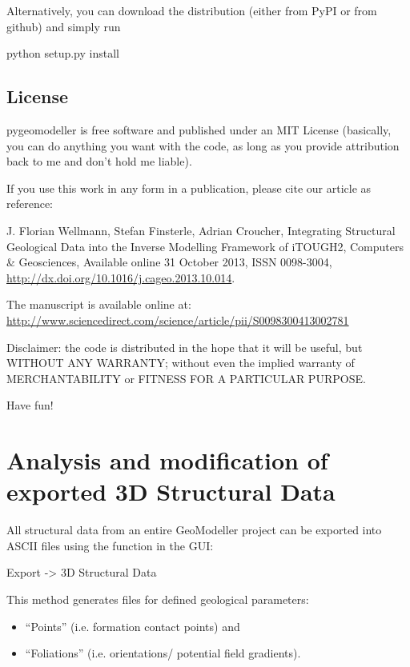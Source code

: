 \documentclass[letterpaper,10pt,english]{sphinxmanual}
\begin{document}
Alternatively, you can download the distribution (either from PyPI or
from github) and simply run

python setup.py install


\section{License}
\label{readme:license}
pygeomodeller is free software and published under an MIT License
(basically, you can do anything you want with the code, as long as you
provide attribution back to me and don't hold me liable).

If you use this work in any form in a publication, please cite our
article as reference:

J. Florian Wellmann, Stefan Finsterle, Adrian Croucher, Integrating
Structural Geological Data into the Inverse Modelling Framework of
iTOUGH2, Computers \& Geosciences, Available online 31 October 2013, ISSN
0098-3004, \href{http://dx.doi.org/10.1016/j.cageo.2013.10.014}{http://dx.doi.org/10.1016/j.cageo.2013.10.014}.

The manuscript is available online at:
\href{http://www.sciencedirect.com/science/article/pii/S0098300413002781}{http://www.sciencedirect.com/science/article/pii/S0098300413002781}

Disclaimer: the code is distributed in the hope that it will be useful,
but WITHOUT ANY WARRANTY; without even the implied warranty of
MERCHANTABILITY or FITNESS FOR A PARTICULAR PURPOSE.

Have fun!


\chapter{Analysis and modification of exported 3D Structural Data}
\label{3D-Structural-Data::doc}\label{3D-Structural-Data:analysis-and-modification-of-exported-3d-structural-data}
All structural data from an entire GeoModeller project can be exported
into ASCII files using the function in the GUI:

Export -\textgreater{} 3D Structural Data

This method generates files for defined geological parameters:
\begin{itemize}
\item {} 
``Points'' (i.e. formation contact points) and

\item {} 
``Foliations'' (i.e. orientations/ potential field gradients).

\end{itemize}
\end{document}
